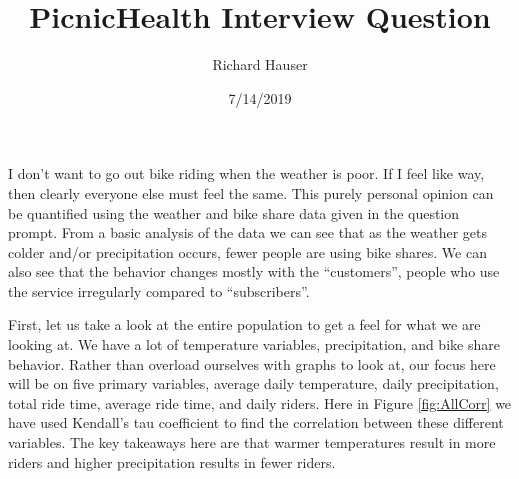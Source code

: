 \documentclass{report}
\begin{document}
\title{PicnicHealth Interview Question}
\author{Richard Hauser}
\date{7/14/2019}
\maketitle

	I don't want to go out bike riding when the weather is poor. If I feel like way, then clearly everyone else must feel the same. This purely personal opinion can be quantified using the weather and bike share data given in the question prompt. From a basic analysis of the data we can see that as the weather gets colder and/or precipitation occurs, fewer people are using bike shares. We can also see that the behavior changes mostly with the “customers”, people who use the service irregularly compared to “subscribers”.

	First, let us take a look at the entire population to get a feel for what we are looking at. We have a lot of temperature variables, precipitation, and bike share behavior. Rather than overload ourselves with graphs to look at, our focus here will be on five primary variables, average daily temperature, daily precipitation, total ride time, average ride time, and daily riders. Here in Figure \ref{fig:AllCorr} we have used Kendall's tau coefficient to find the correlation between these different variables. The key takeaways here are that warmer temperatures result in more riders and higher precipitation results in fewer riders. 
\end{document}
